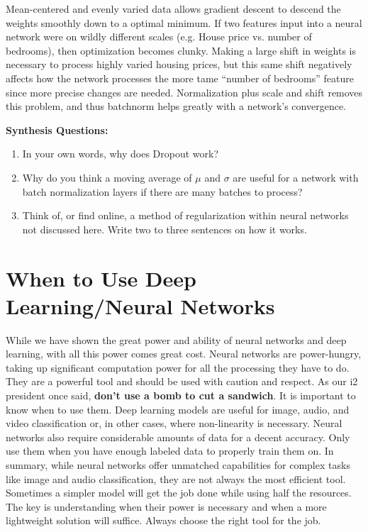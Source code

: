 \begin{flushleft}
    Mean-centered and evenly varied data allows gradient descent to descend the weights smoothly down to a optimal minimum. If two features input into a neural network were on wildly different scales (e.g. House price vs. number of bedrooms), then optimization becomes clunky. Making a large shift in weights is necessary to process highly varied housing prices, but this same shift negatively affects how the network processes the more tame ``number of bedrooms'' feature since more precise changes are needed. Normalization plus scale and shift removes this problem, and thus batchnorm helps greatly with a network's convergence.
\end{flushleft}

\begin{questionbox}
    \textbf{Synthesis Questions:}
    \begin{enumerate}
        \item In your own words, why does Dropout work?
        \item Why do you think a moving average of $\mu$ and $\sigma$ are useful for a network with batch normalization layers if there are many batches to process?
        \item Think of, or find online, a method of regularization within neural networks not discussed here. Write two to three sentences on how it works.
    \end{enumerate}
\end{questionbox}

\section{When to Use Deep Learning/Neural Networks}
\begin{flushleft}
    \large While we have shown the great power and ability of neural networks and deep learning, with all this power comes great cost. Neural networks are power-hungry, taking up significant computation power for all the processing they have to do. They are a powerful tool and should be used with caution and respect. As our i2 president once said, \textbf{don't use a bomb to cut a sandwich}. It is important to know when to use them. Deep learning models are useful for image, audio, and video classification or, in other cases, where non-linearity is necessary. Neural networks also require considerable amounts of data for a decent accuracy. Only use them when you have enough labeled data to properly train them on. In summary, while neural networks offer unmatched capabilities for complex tasks like image and audio classification, they are not always the most efficient tool. Sometimes a simpler model will get the job done while using half the resources. The key is understanding when their power is necessary and when a more lightweight solution will suffice. Always choose the right tool for the job.
\end{flushleft}

